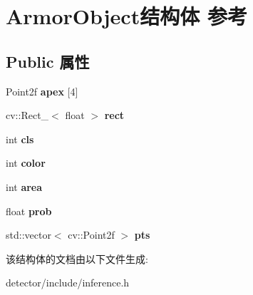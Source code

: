 \hypertarget{struct_armor_object}{}\section{Armor\+Object结构体 参考}
\label{struct_armor_object}
\subsection*{Public 属性}
\begin{DoxyCompactItemize}
\item 
\mbox{\label{struct_armor_object_ab568e55a67ef3ab227c36fda850b512a}} 
Point2f {\bfseries apex} \mbox{[}4\mbox{]}
\item 
\mbox{\label{struct_armor_object_a933d6d61a8230636ee25dbec9b418fdf}} 
cv\+::\+Rect\+\_\+$<$ float $>$ {\bfseries rect}
\item 
\mbox{\label{struct_armor_object_a2a1e65b74874fb58e598cf04279130b3}} 
int {\bfseries cls}
\item 
\mbox{\label{struct_armor_object_a5ba4deb66c6b7bf6dcb94871f4b6333b}} 
int {\bfseries color}
\item 
\mbox{\label{struct_armor_object_a818c5ef90d3482b509ef4f92e695775c}} 
int {\bfseries area}
\item 
\mbox{\label{struct_armor_object_a111f29c27fdf2d04102c13aebb54ebef}} 
float {\bfseries prob}
\item 
\mbox{\label{struct_armor_object_ad29046c851012b0bec223217fa9ab500}} 
std\+::vector$<$ cv\+::\+Point2f $>$ {\bfseries pts}
\end{DoxyCompactItemize}


该结构体的文档由以下文件生成\+:\begin{DoxyCompactItemize}
\item 
detector/include/inference.\+h\end{DoxyCompactItemize}
